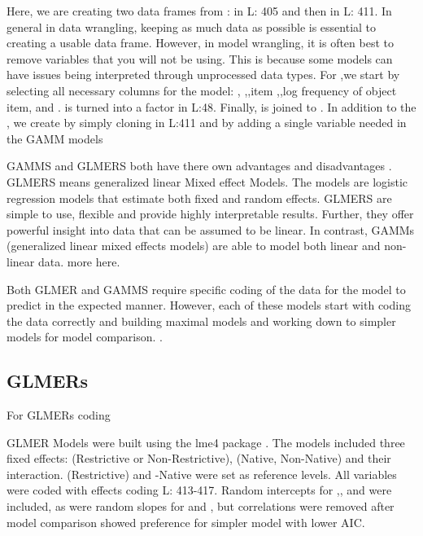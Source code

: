  Here, we are creating two data frames from :  in L: 405 and then  in L: 411. In general in data wrangling, keeping as much data as possible is essential to creating a usable data frame. However, in model wrangling, it is often best to remove variables that you will not be using. This is because some models can have issues being interpreted through unprocessed data types. For ,we start by selecting all necessary columns for the model: , ,,item ,,log frequency of object item, and  .  is turned into a factor in L:48. Finally,  is joined to . In addition to the , we create  by simply cloning  in L:411 and by adding a single variable needed in the GAMM models



GAMMS and GLMERS both have there own advantages and disadvantages \parencite{Ito_Knoeferle_2022}. GLMERS means generalized linear Mixed effect Models. The models are logistic regression models that estimate both fixed and random effects. GLMERS are simple to use, flexible and provide highly interpretable results. Further, they offer powerful insight into data that can be assumed to be linear. In contrast, GAMMs (generalized linear mixed effects models) are able to model both linear and non-linear data. more here.

Both GLMER and GAMMS require specific coding of the data for the model to predict in the expected manner. However, each of these models start with coding the data correctly and building maximal models and working down to simpler models for model comparison. \parencite{max model}.

\subsection{GLMERs}

For GLMERs coding 




GLMER Models were built using the lme4 package \parencite{Bates2014-eq}. The models included three fixed effects:  (Restrictive or Non-Restrictive), (Native, Non-Native) and their interaction. (Restrictive) and -Native were set as reference levels. All variables were coded with
effects coding L: 413-417. Random intercepts for ,, and
 were included, as were random slopes for  and , but correlations were removed after model comparison showed preference for simpler model with lower AIC.





